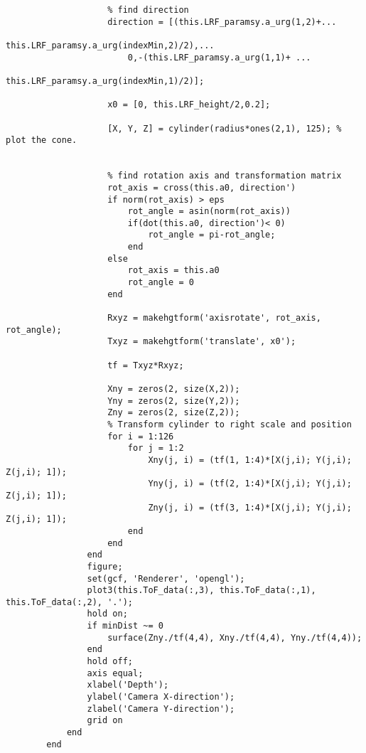 \begin{lstlisting}
                    % find direction
                    direction = [(this.LRF_paramsy.a_urg(1,2)+...
                                            this.LRF_paramsy.a_urg(indexMin,2)/2),...
                        0,-(this.LRF_paramsy.a_urg(1,1)+ ...
                                            this.LRF_paramsy.a_urg(indexMin,1)/2)];
                    
                    x0 = [0, this.LRF_height/2,0.2];
                 
                    [X, Y, Z] = cylinder(radius*ones(2,1), 125); % plot the cone.
                    
                    
                    % find rotation axis and transformation matrix
                    rot_axis = cross(this.a0, direction')
                    if norm(rot_axis) > eps
                        rot_angle = asin(norm(rot_axis))
                        if(dot(this.a0, direction')< 0)
                            rot_angle = pi-rot_angle;
                        end
                    else
                        rot_axis = this.a0
                        rot_angle = 0
                    end
                    
                    Rxyz = makehgtform('axisrotate', rot_axis, rot_angle);
                    Txyz = makehgtform('translate', x0');
                    
                    tf = Txyz*Rxyz;
                    
                    Xny = zeros(2, size(X,2));
                    Yny = zeros(2, size(Y,2));
                    Zny = zeros(2, size(Z,2));
                    % Transform cylinder to right scale and position
                    for i = 1:126
                        for j = 1:2
                            Xny(j, i) = (tf(1, 1:4)*[X(j,i); Y(j,i); Z(j,i); 1]);
                            Yny(j, i) = (tf(2, 1:4)*[X(j,i); Y(j,i); Z(j,i); 1]);
                            Zny(j, i) = (tf(3, 1:4)*[X(j,i); Y(j,i); Z(j,i); 1]);
                        end
                    end
                end
                figure;
                set(gcf, 'Renderer', 'opengl');
                plot3(this.ToF_data(:,3), this.ToF_data(:,1), this.ToF_data(:,2), '.');
                hold on;
                if minDist ~= 0
                    surface(Zny./tf(4,4), Xny./tf(4,4), Yny./tf(4,4));
                end
                hold off;
                axis equal;
                xlabel('Depth');
                ylabel('Camera X-direction');
                zlabel('Camera Y-direction');
                grid on
            end
        end
 

\end{lstlisting}
